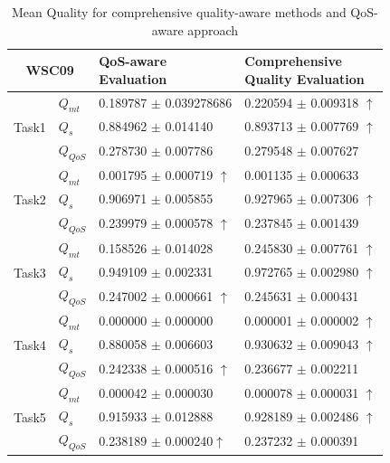 \documentclass{llncs}
\begin{document}
\begin{table}[]
\footnotesize
\centering
\caption{Mean Quality for comprehensive quality-aware methods and QoS-aware approach}
\label{decisionTable}
\begin{tabular}{l|l|l|l}
\hline
\multicolumn{2}{c|}{WSC09}              & \shortstack{QoS-aware \\ Evaluation} & \shortstack{Comprehensive \\ Quality Evaluation} \\ \hline
\multirow{3}{*}{Task1}  &$Q_{mt}$   &0.189787 $\pm$ 0.039278686  &0.220594 $\pm$ 0.009318 $\uparrow$ \\ \cline{2-4} 
                        &$Q_{s}$    &0.884962 $\pm$ 0.014140   &0.893713 $\pm$ 0.007769  $\uparrow$ \\ \cline{2-4}
                        &$Q_{QoS}$  &0.278730 $\pm$ 0.007786     &0.279548 $\pm$ 0.007627                          \\ \hline
\multirow{3}{*}{Task2}  &$Q_{mt}$   &0.001795 $\pm$ 0.000719 $\uparrow$    &0.001135 $\pm$ 0.000633  \\ \cline{2-4} 
                        &$Q_{s}$    &0.906971 $\pm$ 0.005855     &0.927965 $\pm$ 0.007306 $\uparrow$   \\ \cline{2-4}
                        &$Q_{QoS}$  &0.239979 $\pm$ 0.000578 $\uparrow$     &0.237845 $\pm$ 0.001439 \\ \hline
\multirow{3}{*}{Task3}  &$Q_{mt}$   &0.158526 $\pm$ 0.014028               &  0.245830 $\pm$ 0.007761 $\uparrow$   \\ \cline{2-4} 
                        &$Q_{s}$    &0.949109 $\pm$ 0.002331           &   0.972765 $\pm$ 0.002980 $\uparrow$           \\ \cline{2-4}
                        &$Q_{QoS}$  &0.247002 $\pm$ 0.000661 $\uparrow$             &  0.245631 $\pm$ 0.000431            \\ \hline
\multirow{3}{*}{Task4}  &$Q_{mt}$   &0.000000 $\pm$ 0.000000  &0.000001 $\pm$ 0.000002 $\uparrow$ \\ \cline{2-4} 
                        &$Q_{s}$    &0.880058 $\pm$ 0.006603    &0.930632 $\pm$ 0.009043 $\uparrow$ \\ \cline{2-4}
                        &$Q_{QoS}$  &0.242338 $\pm$ 0.000516 $\uparrow$    &0.236677 $\pm$ 0.002211  \\ \hline
\multirow{3}{*}{Task5}  &$Q_{mt}$   &  0.000042 $\pm$ 0.000030     &  0.000078 $\pm$ 0.000031 $\uparrow$           \\ \cline{2-4} 
                        &$Q_{s}$    &  0.915933 $\pm$ 0.012888      &  0.928189 $\pm$ 0.002486 $\uparrow$                 \\ \cline{2-4}
                        &$Q_{QoS}$  & 0.238189 $\pm$ 0.000240$\uparrow$      &  0.237232 $\pm$  0.000391  \\ \hline                                                   
\end{tabular}
\end{table}
\vspace{-0.5cm}
\end{document}
